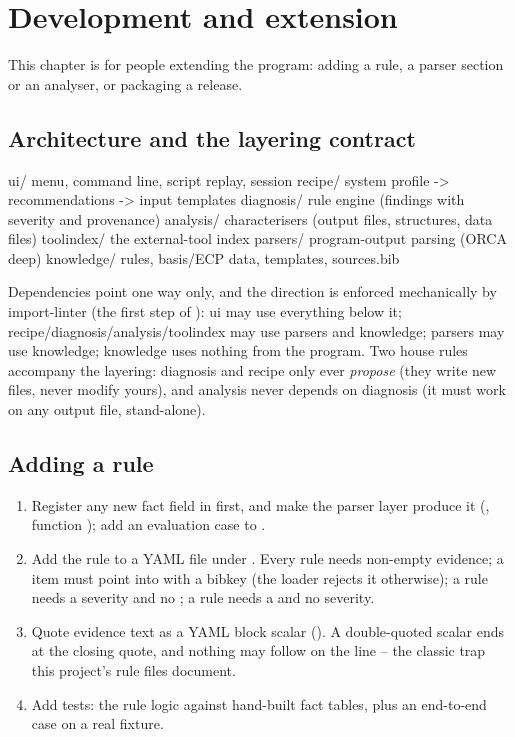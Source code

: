 \chapter{Development and extension}
\label{ch:development}

This chapter is for people extending the program: adding a rule, a parser
section or an analyser, or packaging a release.

\section{Architecture and the layering contract}

\begin{codeblock}
ui/            menu, command line, script replay, session
  recipe/      system profile -> recommendations -> input templates
  diagnosis/   rule engine (findings with severity and provenance)
  analysis/    characterisers (output files, structures, data files)
  toolindex/   the external-tool index
      parsers/     program-output parsing (ORCA deep)
        knowledge/ rules, basis/ECP data, templates, sources.bib
\end{codeblock}

Dependencies point one way only, and the direction is enforced mechanically by
import-linter (the first step of ): ui may use
everything below it; recipe/diagnosis/analysis/toolindex may use parsers and
knowledge; parsers may use knowledge; knowledge uses nothing from the program.
Two house rules accompany the layering: diagnosis and recipe only ever
\emph{propose} (they write new files, never modify yours), and analysis never
depends on diagnosis (it must work on any output file, stand-alone).

\section{Adding a rule}

\begin{enumerate}
  \item Register any new fact field in  first,
    and make the parser layer produce it (, function
    ); add an evaluation case to .
  \item Add the rule to a YAML file under . Every rule
    needs non-empty evidence; a  item must point into
     with a bibkey (the loader rejects it otherwise); a
     rule needs a severity and no ; a
     rule needs a  and no severity.
  \item Quote evidence text as a YAML block scalar (\code{>-}). A
    double-quoted scalar ends at the closing quote, and nothing may follow on
    the line -- the classic trap this project's rule files document.
  \item Add tests: the rule logic against hand-built fact tables, plus an
    end-to-end case on a real fixture.
\end{enumerate}

